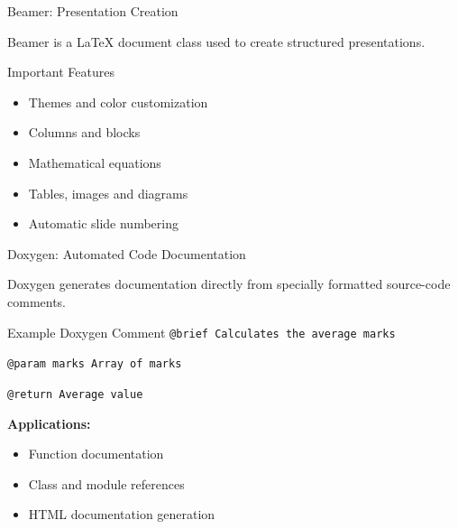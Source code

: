 \documentclass[aspectratio=169,11pt]{beamer}
\begin{document}
\begin{frame}{Beamer: Presentation Creation}

    Beamer is a LaTeX document class used to
    create structured presentations.

    \vspace{0.4cm}

    \begin{block}{Important Features}
        \begin{itemize}
            \item Themes and color customization
            \item Columns and blocks
            \item Mathematical equations
            \item Tables, images and diagrams
            \item Automatic slide numbering
        \end{itemize}
    \end{block}

\end{frame}

\begin{frame}{Doxygen: Automated Code Documentation}

    Doxygen generates documentation directly from
    specially formatted source-code comments.

    \vspace{0.3cm}

    \begin{exampleblock}{Example Doxygen Comment}
        \texttt{@brief Calculates the average marks}

        \texttt{@param marks Array of marks}

        \texttt{@return Average value}
    \end{exampleblock}

    \textbf{Applications:}
    \begin{itemize}
        \item Function documentation
        \item Class and module references
        \item HTML documentation generation
    \end{itemize}

\end{frame}
\end{document}
